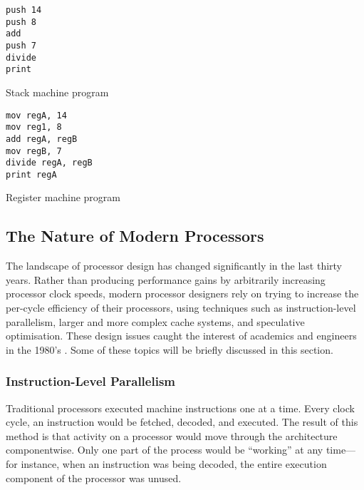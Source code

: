 			\begin{doublefig}
				\begin{halffig}
					\begin{lstlisting}
push 14
push 8
add
push 7
divide
print
					\end{lstlisting}
					\caption{Stack machine program}
					\label{fig:stackprogram}
				\end{halffig}
				\begin{halffig}
					\begin{lstlisting}
mov regA, 14
mov reg1, 8
add regA, regB
mov regB, 7
divide regA, regB
print regA
					\end{lstlisting}
					\caption{Register machine program}
					\label{fig:registerprogram}
				\end{halffig}
			\end{doublefig}
			
			
		\subsection{The Nature of Modern Processors}
			The landscape of processor design has changed significantly in the last thirty years. Rather than producing performance gains by arbitrarily increasing processor clock speeds, modern processor designers rely on trying to increase the per-cycle efficiency of their processors, using techniques such as instruction-level parallelism, larger and more complex cache systems, and speculative optimisation. These design issues caught the interest of academics and engineers in the 1980's \citep{modernprocessordesign}. Some of these topics will be briefly discussed in this section.
			
			\subsubsection{Instruction-Level Parallelism}
			Traditional processors executed machine instructions one at a time. Every clock cycle, an instruction would be fetched, decoded, and executed. The result of this method is that activity on a processor would move through the architecture componentwise. Only one part of the process would be ``working'' at any time---for instance, when an instruction was being decoded, the entire execution component of the processor was unused.
			
